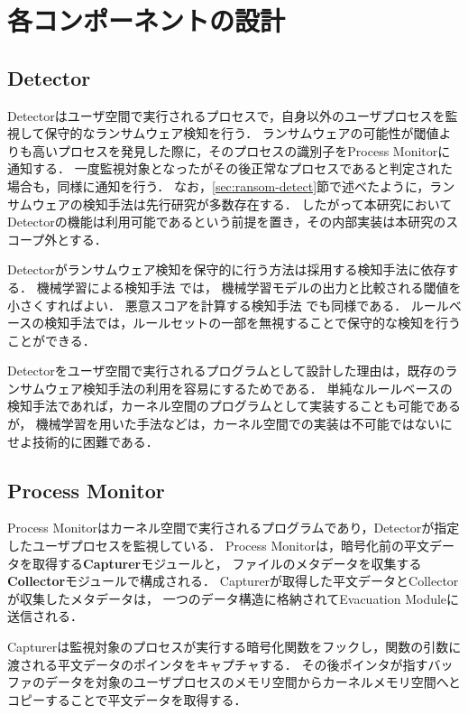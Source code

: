 \section{各コンポーネントの設計}
\subsection{Detector}
Detectorはユーザ空間で実行されるプロセスで，自身以外のユーザプロセスを監視して保守的なランサムウェア検知を行う．
ランサムウェアの可能性が閾値よりも高いプロセスを発見した際に，そのプロセスの識別子をProcess Monitorに通知する．
一度監視対象となったがその後正常なプロセスであると判定された場合も，同様に通知を行う．
なお，\ref{sec:ransom-detect}節で述べたように，ランサムウェアの検知手法は先行研究が多数存在する．
したがって本研究においてDetectorの機能は利用可能であるという前提を置き，その内部実装は本研究のスコープ外とする．

Detectorがランサムウェア検知を保守的に行う方法は採用する検知手法に依存する．
機械学習による検知手法 \cite{alraizza2023ransomware,matos2018rockfs,wan2018feature}では，
機械学習モデルの出力と比較される閾値を小さくすればよい．
悪意スコアを計算する検知手法 \cite{kharraz2017redemption} でも同様である．
ルールベースの検知手法では，ルールセットの一部を無視することで保守的な検知を行うことができる．

Detectorをユーザ空間で実行されるプログラムとして設計した理由は，既存のランサムウェア検知手法の利用を容易にするためである．
単純なルールベースの検知手法であれば，カーネル空間のプログラムとして実装することも可能であるが，
機械学習を用いた手法などは，カーネル空間での実装は不可能ではないにせよ技術的に困難である．

\subsection{Process Monitor}
Process Monitorはカーネル空間で実行されるプログラムであり，Detectorが指定したユーザプロセスを監視している．
Process Monitorは，暗号化前の平文データを取得する\textbf{Capturer}モジュールと，
ファイルのメタデータを収集する\textbf{Collector}モジュールで構成される．
Capturerが取得した平文データとCollectorが収集したメタデータは，
一つのデータ構造に格納されてEvacuation Moduleに送信される．

Capturerは監視対象のプロセスが実行する暗号化関数をフックし，関数の引数に渡される平文データのポインタをキャプチャする．
その後ポインタが指すバッファのデータを対象のユーザプロセスのメモリ空間からカーネルメモリ空間へとコピーすることで平文データを取得する．

